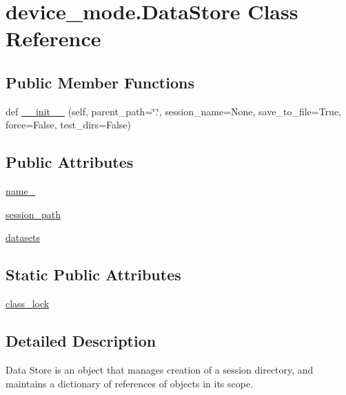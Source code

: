 \hypertarget{classdevice__mode_1_1DataStore}{}\section{device\+\_\+mode.\+Data\+Store Class Reference}
\label{classdevice__mode_1_1DataStore}
\subsection*{Public Member Functions}
\begin{DoxyCompactItemize}
\item 
def \hyperlink{classdevice__mode_1_1DataStore_a641442fc9847435e17d158c22864b698}{\+\_\+\+\_\+init\+\_\+\+\_\+} (self, parent\+\_\+path=\char`\"{}.\char`\"{}, session\+\_\+name=None, save\+\_\+to\+\_\+file=True, force=False, test\+\_\+dirs=False)
\end{DoxyCompactItemize}
\subsection*{Public Attributes}
\begin{DoxyCompactItemize}
\item 
\hyperlink{classdevice__mode_1_1DataStore_ae6213989655f77d563bf81a9f31d3a40}{name\+\_\+}
\item 
\hyperlink{classdevice__mode_1_1DataStore_a2bca6bb04f95cf5118e60cec9db643fe}{session\+\_\+path}
\item 
\hyperlink{classdevice__mode_1_1DataStore_aa2653d93b009e041c921f2dff7df7710}{datasets}
\end{DoxyCompactItemize}
\subsection*{Static Public Attributes}
\begin{DoxyCompactItemize}
\item 
\hyperlink{classdevice__mode_1_1DataStore_addd44f969caf158960b867e638909560}{class\+\_\+lock}
\end{DoxyCompactItemize}


\subsection{Detailed Description}
\begin{DoxyVerb}Data Store is an object that manages creation of a session directory, 
and maintains a dictionary of references of objects in its scope.
\end{DoxyVerb}
 

